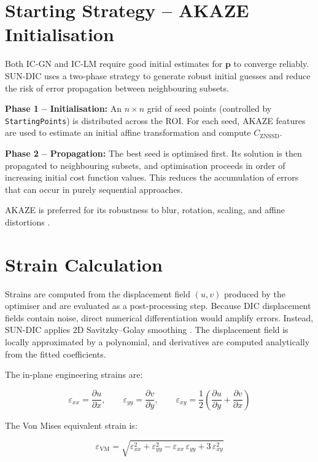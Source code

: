 \section{Starting Strategy -- AKAZE Initialisation}
\label{sec:start}

Both IC-GN and IC-LM require good initial estimates for $\mathbf{p}$ to converge reliably. SUN-DIC uses a two-phase strategy to generate robust initial guesses and reduce the risk of error propagation between neighbouring subsets.

\textbf{Phase 1 -- Initialisation:} An $n \times n$ grid of seed points (controlled by \texttt{StartingPoints}) is distributed across the ROI. For each seed, AKAZE features \citep{Alcantarilla2013} are used to estimate an initial affine transformation and compute $C_\text{ZNSSD}$.

\textbf{Phase 2 -- Propagation:} The best seed is optimised first. Its solution is then propagated to neighbouring subsets, and optimisation proceeds in order of increasing initial cost function values. This reduces the accumulation of errors that can occur in purely sequential approaches.

AKAZE is preferred for its robustness to blur, rotation, scaling, and affine distortions \citep{Isik2024}.


\section{Strain Calculation}
\label{sec:strain}

Strains are computed from the displacement field $(u, v)$ produced by the optimiser and are evaluated as a post-processing step. Because DIC displacement fields contain noise, direct numerical differentiation would amplify errors.  Instead, SUN-DIC applies 2D Savitzky--Golay smoothing \citep{Pan2007a}. The displacement field is locally approximated by a polynomial, and derivatives are computed analytically from the fitted coefficients.

\newpage
The in-plane engineering strains are:

\begin{equation}
	\label{eqn:strains}
	\varepsilon_{xx} = \frac{\partial u}{\partial x}, \qquad
	\varepsilon_{yy} = \frac{\partial v}{\partial y}, \qquad
	\varepsilon_{xy} = \frac{1}{2}\!\left(
	\frac{\partial u}{\partial y} + \frac{\partial v}{\partial x}
	\right)
\end{equation}

The Von Mises equivalent strain is:

\begin{equation}
	\label{eqn:vonmises}
	\varepsilon_\text{VM} =
	\sqrt{
		\varepsilon_{xx}^2
		+ \varepsilon_{yy}^2
		- \varepsilon_{xx}\,\varepsilon_{yy}
		+ 3\,\varepsilon_{xy}^2
	}
\end{equation}
